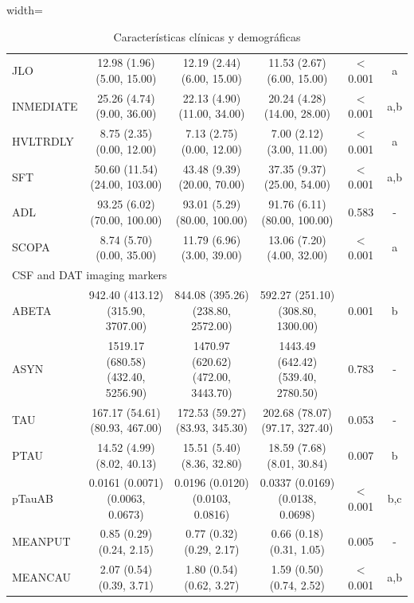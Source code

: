 \begin{description}
\begin{table}[t]
\begin{adjustbox}{width=\textwidth}
\begin{tabular}{|l||c|c|c|c|c|}
				JLO &         12.98 (1.96) (5.00, 15.00) &         12.19 (2.44) (6.00, 15.00) &         11.53 (2.67) (6.00, 15.00) & $<$ 0.001 &        a \\
				INMEDIATE &         25.26 (4.74) (9.00, 36.00) &        22.13 (4.90) (11.00, 34.00) &        20.24 (4.28) (14.00, 28.00) & $<$ 0.001 &      a,b \\
				HVLTRDLY &          8.75 (2.35) (0.00, 12.00) &          7.13 (2.75) (0.00, 12.00) &          7.00 (2.12) (3.00, 11.00) & $<$ 0.001 &        a \\
				SFT &      50.60 (11.54) (24.00, 103.00) &        43.48 (9.39) (20.00, 70.00) &        37.35 (9.37) (25.00, 54.00) & $<$ 0.001 &      a,b \\
				ADL &       93.25 (6.02) (70.00, 100.00) &       93.01 (5.29) (80.00, 100.00) &       91.76 (6.11) (80.00, 100.00) &     0.583 &   -   \\
				SCOPA &          8.74 (5.70) (0.00, 35.00) &         11.79 (6.96) (3.00, 39.00) &         13.06 (7.20) (4.00, 32.00) & $<$ 0.001 &        a \\
				\hline
				\multicolumn{6}{|l|}{CSF and DAT imaging markers} \\
				\hline
				ABETA &  942.40 (413.12) (315.90, 3707.00) &  844.08 (395.26) (238.80, 2572.00) &  592.27 (251.10) (308.80, 1300.00) &     0.001 &        b \\
				ASYN & 1519.17 (680.58) (432.40, 5256.90) & 1470.97 (620.62) (472.00, 3443.70) & 1443.49 (642.42) (539.40, 2780.50) &     0.783 &  -    \\
				TAU &     167.17 (54.61) (80.93, 467.00) &     172.53 (59.27) (83.93, 345.30) &     202.68 (78.07) (97.17, 327.40) &     0.053 &   -   \\
				PTAU &         14.52 (4.99) (8.02, 40.13) &         15.51 (5.40) (8.36, 32.80) &         18.59 (7.68) (8.01, 30.84) &     0.007 &        b \\
				pTauAB &   0.0161 (0.0071) (0.0063, 0.0673) &   0.0196 (0.0120) (0.0103, 0.0816) &   0.0337 (0.0169) (0.0138, 0.0698) & $<$ 0.001 &      b,c \\
				MEANPUT &           0.85 (0.29) (0.24, 2.15) &           0.77 (0.32) (0.29, 2.17) &           0.66 (0.18) (0.31, 1.05) &     0.005 &    -      \\
				MEANCAU &           2.07 (0.54) (0.39, 3.71) &           1.80 (0.54) (0.62, 3.27) &           1.59 (0.50) (0.74, 2.52) & $<$ 0.001 &      a,b \\ 
				\bottomrule
			\end{tabular}
		\end{adjustbox}
		\caption{Características clínicas y demográficas}
		\label{tab:tabla2}
	\end{table}
	
\end{description}






